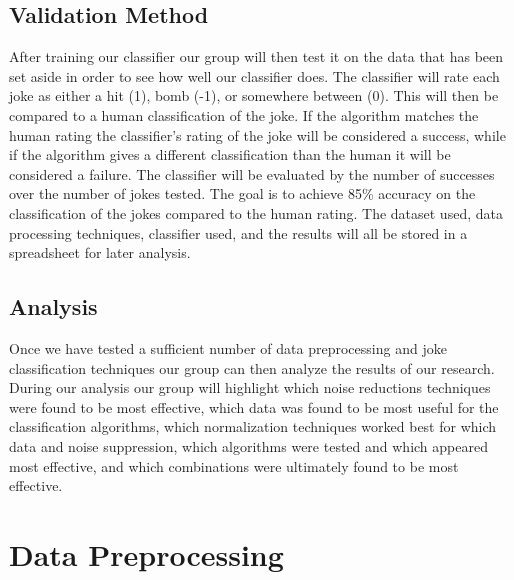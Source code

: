\documentclass[onecolumn, draftclsnofoot,10pt, compsoc]{IEEEtran}
\begin{document}
\subsection{Validation Method}
After training our classifier our group will then test it on the data that has been set aside in order to see how well our classifier does. The classifier will rate each joke as either a hit (1), bomb (-1), or somewhere between (0). This will then be compared to a human classification of the joke. If the algorithm matches the human rating the classifier's rating of the joke will be considered a success, while if the algorithm gives a different classification than the human it will be considered a failure. The classifier will be evaluated by the number of successes over the number of jokes tested. The goal is to achieve 85\% accuracy on the classification of the jokes compared to the human rating. The dataset used, data processing techniques, classifier used, and the results will all be stored in a spreadsheet for later analysis.
\subsection{Analysis}
Once we have tested a sufficient number of data preprocessing and joke classification techniques our group can then analyze the results of our research. During our analysis our group will highlight which noise reductions techniques were found to be most effective, which data was found to be most useful for the classification algorithms, which normalization techniques worked best for which data and noise suppression, which algorithms were tested and which appeared most effective, and which combinations were ultimately found to be most effective.

\section{Data Preprocessing}
\end{document}
